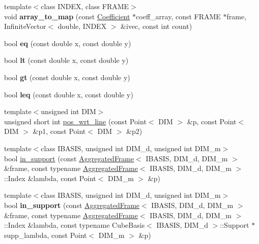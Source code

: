 \begin{CompactItemize}
\item 
\hypertarget{namespaceFrameTL_3b946e677f70c5b04b3cec8feeadc20e}{
{\footnotesize template$<$class INDEX, class FRAME$>$ }\\void \textbf{array\_\-to\_\-map} (const \hyperlink{structFrameTL_1_1Coefficient}{Coefficient} $\ast$coeff\_\-array, const FRAME $\ast$frame, InfiniteVector$<$ double, INDEX $>$ \&ivec, const int count)}
\label{namespaceFrameTL_3b946e677f70c5b04b3cec8feeadc20e}

\item 
\hypertarget{namespaceFrameTL_26ebfba3c24541d4c0b1e7591fbb6d47}{
bool \textbf{eq} (const double x, const double y)}
\label{namespaceFrameTL_26ebfba3c24541d4c0b1e7591fbb6d47}

\item 
\hypertarget{namespaceFrameTL_6bb8df9a03d57ebc0a19a9d58fddf19b}{
bool \textbf{lt} (const double x, const double y)}
\label{namespaceFrameTL_6bb8df9a03d57ebc0a19a9d58fddf19b}

\item 
\hypertarget{namespaceFrameTL_8004ad60ec83531e6c45e0e45d09d73b}{
bool \textbf{gt} (const double x, const double y)}
\label{namespaceFrameTL_8004ad60ec83531e6c45e0e45d09d73b}

\item 
\hypertarget{namespaceFrameTL_524bc935ed1e0794c223e364ce0dbc96}{
bool \textbf{leq} (const double x, const double y)}
\label{namespaceFrameTL_524bc935ed1e0794c223e364ce0dbc96}

\item 
{\footnotesize template$<$unsigned int DIM$>$ }\\unsigned short int \hyperlink{namespaceFrameTL_d4045e5ba1e89e5fbdd9084024f16ae0}{pos\_\-wrt\_\-line} (const Point$<$ DIM $>$ \&p, const Point$<$ DIM $>$ \&p1, const Point$<$ DIM $>$ \&p2)
\item 
{\footnotesize template$<$class IBASIS, unsigned int DIM\_\-d, unsigned int DIM\_\-m$>$ }\\bool \hyperlink{namespaceFrameTL_0699f5e7931ab40bf346b17e6c3bde01}{in\_\-support} (const \hyperlink{classFrameTL_1_1AggregatedFrame}{AggregatedFrame}$<$ IBASIS, DIM\_\-d, DIM\_\-m $>$ \&frame, const typename \hyperlink{classFrameTL_1_1AggregatedFrame}{AggregatedFrame}$<$ IBASIS, DIM\_\-d, DIM\_\-m $>$::Index \&lambda, const Point$<$ DIM\_\-m $>$ \&p)
\item 
\hypertarget{namespaceFrameTL_42d9dd29c91fe172a30736eb38ee21e9}{
{\footnotesize template$<$class IBASIS, unsigned int DIM\_\-d, unsigned int DIM\_\-m$>$ }\\bool \textbf{in\_\-support} (const \hyperlink{classFrameTL_1_1AggregatedFrame}{AggregatedFrame}$<$ IBASIS, DIM\_\-d, DIM\_\-m $>$ \&frame, const typename \hyperlink{classFrameTL_1_1AggregatedFrame}{AggregatedFrame}$<$ IBASIS, DIM\_\-d, DIM\_\-m $>$::Index \&lambda, const typename CubeBasis$<$ IBASIS, DIM\_\-d $>$::Support $\ast$supp\_\-lambda, const Point$<$ DIM\_\-m $>$ \&p)}
\label{namespaceFrameTL_42d9dd29c91fe172a30736eb38ee21e9}


\end{CompactItemize}
